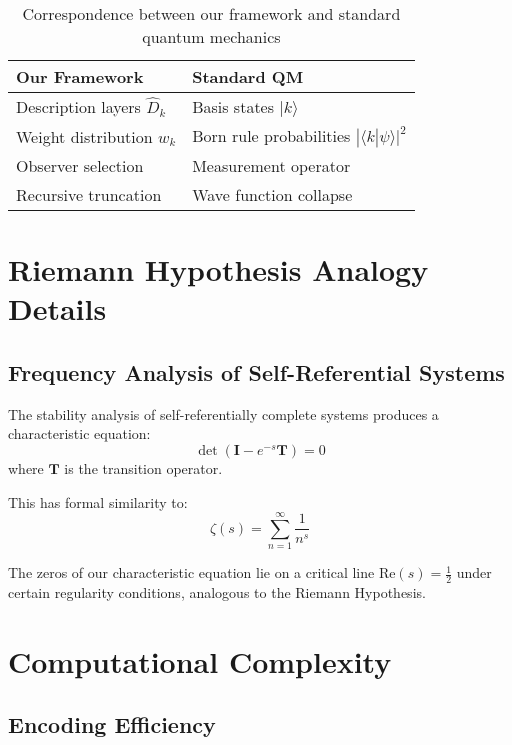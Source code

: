 \begin{table}[h]
\centering
\caption{Correspondence between our framework and standard quantum mechanics}
\label{tab:qm-correspondence}
\begin{tabular}{ll}
\hline
\textbf{Our Framework} & \textbf{Standard QM} \\
\hline
Description layers ${\hat{D}_k}$ & Basis states ${|k\rangle}$ \\
Weight distribution $w_k$ & Born rule probabilities $|\langle k|\psi\rangle|^2$ \\
Observer selection & Measurement operator \\
Recursive truncation & Wave function collapse \\
\hline
\end{tabular}
\end{table}

\section{Riemann Hypothesis Analogy Details}

\subsection{Frequency Analysis of Self-Referential Systems}

The stability analysis of self-referentially complete systems produces a characteristic equation:
\begin{equation}
\det(\mathbf{I} - e^{-s}\mathbf{T}) = 0
\end{equation}
where $\mathbf{T}$ is the transition operator.

This has formal similarity to:
\begin{equation}
\zeta(s) = \sum_{n=1}^{\infty} \frac{1}{n^s}
\end{equation}

The zeros of our characteristic equation lie on a critical line $\text{Re}(s) = \frac{1}{2}$ under certain regularity conditions, analogous to the Riemann Hypothesis.

\section{Computational Complexity}

\subsection{Encoding Efficiency}

